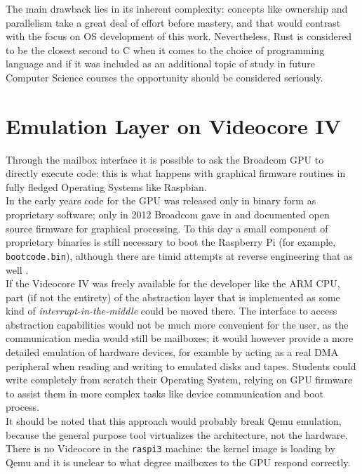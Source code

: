 \documentclass[12pt,a4paper,openright,twoside]{report}
\begin{document}
The main drawback lies in its inherent complexity: concepts like ownership and 
parallelism take a great deal of effort before mastery, and that would contrast
with the focus on OS development of this work. Nevertheless, Rust is considered
to be the closest second to C when it comes to the choice of programming language
and if it was included as an additional topic of study in future Computer Science
courses the opportunity should be considered seriously.

\section{Emulation Layer on Videocore IV}
Through the mailbox interface it is possible to ask the Broadcom GPU to directly
execute code: this is what happens with graphical firmware routines in fully
fledged Operating Systems like Raspbian.\\
In the early years code for the GPU was released only in binary form as proprietary 
software; only in 2012 Broadcom gave in and documented open source firmware for 
graphical processing. To this day a small component of proprietary binaries is 
still necessary to boot the Raspberry Pi (for example, {\tt bootcode.bin}), although
there are timid attempts at reverse engineering that as well \cite{openfirmware}.\\

If the Videocore IV was freely available for the developer like the ARM CPU, part
(if not the entirety) of the abstraction layer that is implemented as some kind of
\textit{interrupt-in-the-middle} could be moved there. The interface to access
abstraction capabilities would not be much more convenient for the user, 
as the communication media would still be mailboxes; it would however provide
a more detailed emulation of hardware devices, for examble by acting as a real
DMA peripheral when reading and writing to emulated disks and tapes.
Students could write completely from scratch their Operating System, relying on 
GPU firmware to assist them in more complex tasks like device communication and
boot process.\\
It should be noted that this approach would probably break Qemu emulation, 
because the general purpose tool virtualizes the architecture, not the hardware.
There is no Videocore in the {\tt raspi3} machine: the kernel image is loading 
by Qemu and it is unclear to what degree mailboxes to the GPU respond correctly.
\end{document}
